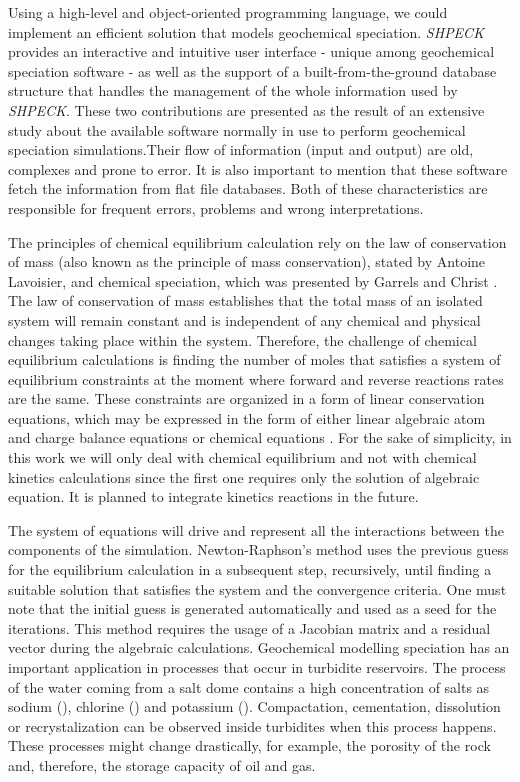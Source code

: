 Using a high-level and object-oriented programming language, we could implement an efficient solution that models geochemical speciation. \emph{SHPECK} provides an interactive and intuitive user interface - unique among geochemical speciation software - as well as the support of a built-from-the-ground database structure that handles the management of the whole information used by \emph{SHPECK}. These two contributions are presented as the result of an extensive study about the available software normally in use to perform geochemical speciation simulations.Their flow of information (input and output) are old, complexes and prone to error. It is also important to mention that these software fetch the information from flat file databases. Both of these characteristics are responsible for frequent errors, problems and wrong interpretations.


The principles of chemical equilibrium calculation rely on the law of conservation of mass (also known as the principle of mass conservation), stated by Antoine Lavoisier, and chemical speciation, which was presented by Garrels and Christ  \cite{Garrels:65}. 
The law of conservation of mass establishes that the total mass of an isolated system will remain constant and is independent of any chemical and physical changes taking place within the system. Therefore, the challenge of chemical equilibrium calculations is finding the number of moles that satisfies a system of equilibrium constraints at the moment where forward and reverse reactions rates are the same. 
These constraints are organized in a form of linear conservation equations, which may be expressed in the form of either linear algebraic atom and charge balance equations or chemical equations \cite{SmithMissen83}. For the sake of simplicity, in this work we will only deal with chemical equilibrium and not with chemical kinetics calculations since the first one requires only the solution of algebraic equation. It is planned to integrate kinetics reactions in the future.


The system of equations will drive and represent all the interactions between the components of the simulation. Newton-Raphson's method uses the previous guess for the equilibrium calculation in a subsequent step, recursively, until finding a suitable solution that satisfies the system and the convergence criteria. 
One must note that the initial guess is generated automatically and used as a seed for the iterations. This method requires the usage of a Jacobian matrix and a residual vector during the algebraic calculations. Geochemical modelling speciation has an important application in processes that occur in turbidite reservoirs. 
The process of the water coming from a salt dome contains a high concentration of salts as sodium (), chlorine () and potassium (). Compactation, cementation, dissolution or recrystalization can be observed inside turbidites when this process happens. These processes might change drastically, for example, the porosity of the rock and, therefore, the storage capacity of oil and gas.


